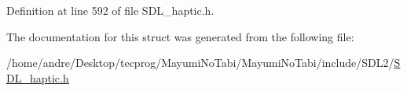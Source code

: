 Definition at line 592 of file S\-D\-L\-\_\-haptic.\-h.



The documentation for this struct was generated from the following file\-:\begin{DoxyCompactItemize}
\item 
/home/andre/\-Desktop/tecprog/\-Mayumi\-No\-Tabi/\-Mayumi\-No\-Tabi/include/\-S\-D\-L2/\hyperlink{_s_d_l__haptic_8h}{S\-D\-L\-\_\-haptic.\-h}\end{DoxyCompactItemize}
